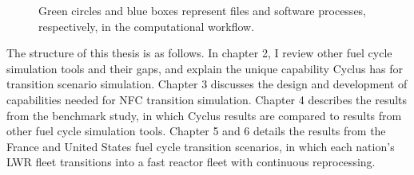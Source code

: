 \begin{figure}
        \centering
{}
\caption{Green circles and blue boxes represent files and software 
processes, respectively, in the computational workflow.}
\label{diag:workflow}
\end{figure}


The structure of this thesis is as follows. In chapter 2, I review other fuel cycle simulation
tools and their gaps, and explain the unique capability Cyclus
has for transition scenario simulation.
Chapter 3 discusses the design and
development of capabilities needed for \gls{NFC} transition simulation.
Chapter 4 describes the results from the benchmark study, in which Cyclus results are compared
to results from other fuel cycle simulation tools.
Chapter 5 and 6 details the results from the France and United States fuel cycle
transition scenarios, in which each nation's \gls{LWR} fleet transitions into
a fast reactor fleet with continuous reprocessing.
